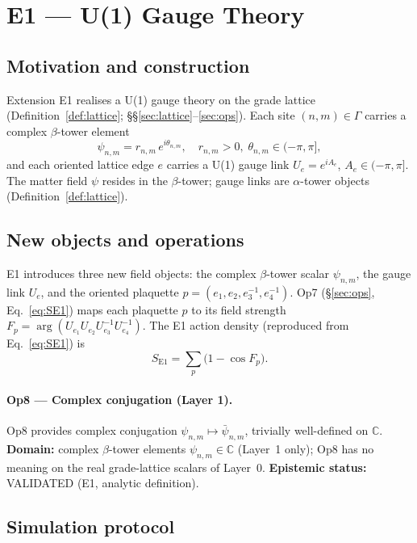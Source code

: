 \documentclass[12pt,a4paper]{article}
\theoremstyle{plain}
\theoremstyle{definition}
\theoremstyle{remark}
\begin{document}
\section{E1 --- U(1) Gauge Theory}
\label{sec:E1}

\subsection{Motivation and construction}

Extension E1 realises a U(1) gauge theory on the grade lattice
(Definition~\ref{def:lattice}; \S\S\ref{sec:lattice}--\ref{sec:ops}).
Each site $(n,m)\in\Gamma$ carries a complex $\beta$-tower element
\[
  \psi_{n,m} = r_{n,m}\,e^{i\theta_{n,m}}, \quad r_{n,m}>0,\;
  \theta_{n,m}\in(-\pi,\pi],
\]
and each oriented lattice edge $e$ carries a U(1) gauge link
$U_e = e^{iA_e}$, $A_e\in(-\pi,\pi]$.
The matter field $\psi$ resides in the $\beta$-tower; gauge links are
$\alpha$-tower objects (Definition~\ref{def:lattice}).

\subsection{New objects and operations}

E1 introduces three new field objects: the complex $\beta$-tower scalar
$\psi_{n,m}$, the gauge link $U_e$, and the oriented plaquette
$p=(e_1,e_2,e_3^{-1},e_4^{-1})$.
Op7 (\S\ref{sec:ops}, Eq.~\ref{eq:SE1}) maps each plaquette $p$ to its
field strength $F_p = \arg(U_{e_1}U_{e_2}U_{e_3}^{-1}U_{e_4}^{-1})$.
The E1 action density (reproduced from Eq.~\ref{eq:SE1}) is
\[
  S_{\mathrm{E1}} = \sum_p \bigl(1 - \cos F_p\bigr).
\]

\paragraph{Op8 --- Complex conjugation (Layer 1).}
Op8 provides complex conjugation $\psi_{n,m}\mapsto\bar{\psi}_{n,m}$,
trivially well-defined on $\mathbb{C}$.
\textbf{Domain:} complex $\beta$-tower elements $\psi_{n,m}\in\mathbb{C}$
(Layer~1 only); Op8 has no meaning on the real grade-lattice scalars of
Layer~0.
\textbf{Epistemic status:} VALIDATED (E1, analytic definition).

\subsection{Simulation protocol}
\end{document}
